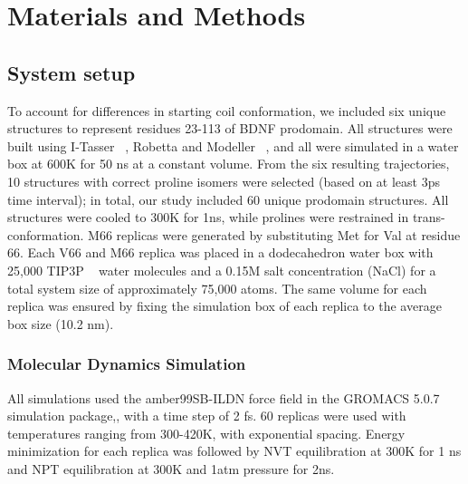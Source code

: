 \documentclass[10pt,letterpaper]{article}
\begin{document}
%

\section*{Materials and Methods}

\subsection*{System setup} To account for differences in starting coil conformation, we included six unique structures to represent residues 23-113 of BDNF prodomain.  All structures were built using I-Tasser ~\cite{Yang2014,Roy2010,Bioinformatics}, Robetta and Modeller ~\cite{Sali1993a}, and all were simulated in a water box at 600K for 50 ns at a constant volume. From the six resulting trajectories, 10 structures with correct proline isomers were selected (based on at least 3ps time interval); in total, our study included 60 unique prodomain structures. All structures were cooled to 300K for 1ns, while prolines were restrained in trans-conformation. M66 replicas were generated by substituting Met for Val at residue 66. Each V66 and M66 replica was placed in a dodecahedron water box with 25,000 TIP3P ~\cite {Jorgensen1983} water molecules and a 0.15M salt concentration (NaCl) for a total system size of approximately 75,000 atoms. The same volume for each replica was ensured by fixing the simulation box of each replica to the average box size (10.2 nm).

\subsubsection*{Molecular Dynamics Simulation} All simulations used the amber99SB-ILDN force field\cite{Lindorff-Larsen} in the GROMACS 5.0.7 simulation package,\cite{Berendsen1995,Abraham2015}, with a time step of 2 fs. 60 replicas were used with temperatures ranging from 300-420K, with exponential spacing. 
Energy minimization for each replica was followed by NVT equilibration at 300K for 1 ns and NPT equilibration at 300K and 1atm pressure for 2ns. 
\end{document}
